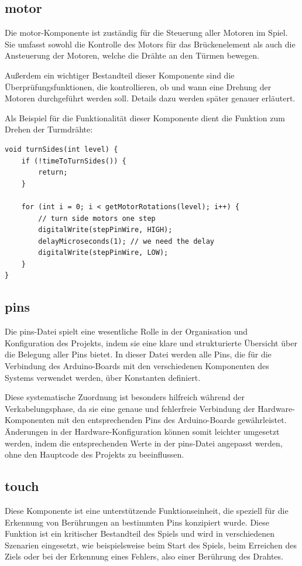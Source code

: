 \subsection{motor}

Die motor-Komponente ist zuständig für die Steuerung aller Motoren im Spiel. Sie umfasst sowohl die Kontrolle des Motors für das Brückenelement als auch die Ansteuerung der Motoren, welche die Drähte an den Türmen bewegen.

Außerdem ein wichtiger Bestandteil dieser Komponente sind die Überprüfungsfunktionen, die kontrollieren, ob und wann eine Drehung der Motoren durchgeführt werden soll. Details dazu werden später genauer erläutert.

Als Beispiel für die Funktionalität dieser Komponente dient die Funktion zum Drehen der Turmdrähte:

\begin{minipage}{\linewidth}
\begin{lstlisting}
void turnSides(int level) {
    if (!timeToTurnSides()) {
        return;
    }

    for (int i = 0; i < getMotorRotations(level); i++) {
        // turn side motors one step
        digitalWrite(stepPinWire, HIGH);
        delayMicroseconds(1); // we need the delay
        digitalWrite(stepPinWire, LOW);
    }
}
\end{lstlisting}
\end{minipage}  


\subsection{pins}
Die pins-Datei spielt eine wesentliche Rolle in der Organisation und Konfiguration des Projekts, indem sie eine klare und strukturierte Übersicht über die Belegung aller Pins bietet. In dieser Datei werden alle Pins, die für die Verbindung des Arduino-Boards mit den verschiedenen Komponenten des Systems verwendet werden, über Konstanten definiert.

Diese systematische Zuordnung ist besonders hilfreich während der Verkabelungsphase, da sie eine genaue und fehlerfreie Verbindung der Hardware-Komponenten mit den entsprechenden Pins des Arduino-Boards gewährleistet. Änderungen in der Hardware-Konfiguration können somit leichter umgesetzt werden, indem die entsprechenden Werte in der pins-Datei angepasst werden, ohne den Hauptcode des Projekts zu beeinflussen.

\subsection{touch}
Diese Komponente ist eine unterstützende Funktionseinheit, die speziell für die Erkennung von Berührungen an bestimmten Pins konzipiert wurde. Diese Funktion ist ein kritischer Bestandteil des Spiels und wird in verschiedenen Szenarien eingesetzt, wie beispielsweise beim Start des Spiels, beim Erreichen des Ziels oder bei der Erkennung eines Fehlers, also einer Berührung des Drahtes.

